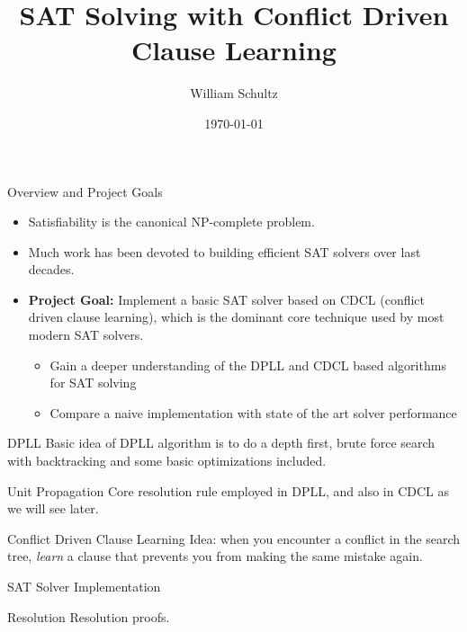 \documentclass{beamer}
\title{SAT Solving with Conflict Driven Clause Learning}
\author{William Schultz}
\institute{CS 7240 Final Project}
\date{\today}
\begin{document}
\begin{frame}
    \titlepage
\end{frame}

\begin{frame}{Overview and Project Goals}
\begin{itemize}
    \item Satisfiability is the canonical NP-complete problem.
    
    \item Much work has been devoted to building efficient SAT solvers over last decades.\\
    
    \item \textbf{Project Goal:} Implement a basic SAT solver based on CDCL (conflict driven clause learning), which is the dominant core technique used by most modern SAT solvers.
    \begin{itemize}
        \item Gain a deeper understanding of the DPLL and CDCL based algorithms for SAT solving
        \item Compare a naive implementation with state of the art solver performance
    \end{itemize}
\end{itemize}
\end{frame}

\begin{frame}{DPLL}
    Basic idea of DPLL algorithm is to do a depth first, brute force search with backtracking and some basic optimizations included.
\end{frame}

\begin{frame}{Unit Propagation}
    Core resolution rule employed in DPLL, and also in CDCL as we will see later.
\end{frame}


\begin{frame}{Conflict Driven Clause Learning}
    Idea: when you encounter a conflict in the search tree, \textit{learn} a clause that prevents you from making the same mistake again.
\end{frame}

\begin{frame}{SAT Solver Implementation}
\end{frame}

\begin{frame}{Resolution}
    Resolution proofs.
\end{frame}
\end{document}
